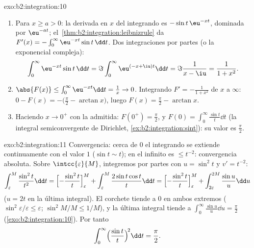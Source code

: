 \begin{solution}{exo:b2:integration:10}
\begin{enumerate}
  \item Para $x \geq a > 0$: la derivada en $x$ del integrando es
        $-\sin t\,\eu^{-xt}$, dominada por $\eu^{-at}$; el~\cref{thm:b2:integration:leibnizrule} da $F'(x) =
        -\int_0^\infty \eu^{-xt}\sin t\,\dd t$. Dos integraciones
        por partes (o la exponencial compleja):
        \[
        \int_0^\infty \eu^{-xt}\sin t\,\dd t
        = \Im \int_0^\infty \eu^{(-x+\iu)t}\dd t
        = \Im\frac{1}{x - \iu} = \frac{1}{1 + x^2} .
        \]
  \item $\abs{F(x)} \leq \int_0^\infty \eu^{-xt}\dd t = \frac1x \to
        0$. Integrando $F' = -\frac{1}{1+x^2}$ de $x$ a $\infty$: $0
        - F(x) = -\bigl(\frac\pi2 - \arctan x\bigr)$, luego $F(x) =
        \frac\pi2 - \arctan x$.
  \item Haciendo $x \to 0^+$ con la  admitida: $F(0^+) =
        \frac\pi2$, y $F(0) = \int_0^\infty \frac{\sin t}{t}\dd t$
        (la integral semiconvergente de Dirichlet,
        \cref{ex:b2:integration:sint}): su valor es $\frac\pi2$.
\end{enumerate}
\end{solution}

\begin{solution}{exo:b2:integration:11}
Convergencia: cerca de $0$ el integrando se extiende
continuamente con el valor $1$ ($\sin t \sim t$); en el infinito es
$\leq t^{-2}$: convergencia absoluta. Sobre
$\intcc{\varepsilon}{M}$, integremos por partes con $u = \sin^2 t$ y
$v' = t^{-2}$:
\[
\int_\varepsilon^M \frac{\sin^2 t}{t^2}\dd t
= \Bigl[-\frac{\sin^2 t}{t}\Bigr]_\varepsilon^M
+ \int_\varepsilon^M \frac{2\sin t\cos t}{t}\dd t
= \Bigl[-\frac{\sin^2 t}{t}\Bigr]_\varepsilon^M
+ \int_{2\varepsilon}^{2M} \frac{\sin u}{u}\dd u
\]
($u = 2t$ en la última integral). El corchete tiende a $0$ en ambos
extremos ($\sin^2\varepsilon/\varepsilon \leq \varepsilon$; $\sin^2
M/M \leq 1/M$), y la última integral tiende a $\int_0^\infty
\frac{\sin u}{u}\dd u = \frac\pi2$ (\cref{exo:b2:integration:10}).
Por tanto
\[
\int_0^\infty \Bigl(\frac{\sin t}{t}\Bigr)^{\!2}\dd t
= \frac\pi2 .
\]
\end{solution}

